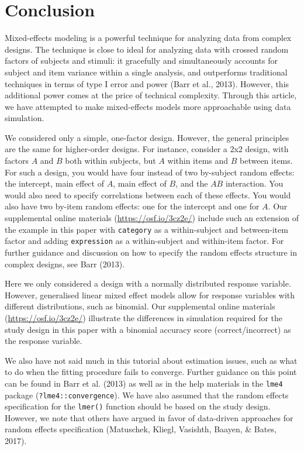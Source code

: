 \documentclass[
  english,
  doc,floatsintext]{apa6}
\begin{document}
\hypertarget{conclusion}{%
\section{Conclusion}\label{conclusion}}

Mixed-effects modeling is a powerful technique for analyzing data from complex designs. The technique is close to ideal for analyzing data with crossed random factors of subjects and stimuli: it gracefully and simultaneously accounts for subject and item variance within a single analysis, and outperforms traditional techniques in terms of type I error and power (Barr et al., 2013). However, this additional power comes at the price of technical complexity. Through this article, we have attempted to make mixed-effects models more approachable using data simulation.

We considered only a simple, one-factor design. However, the general principles are the same for higher-order designs. For instance, consider a 2x2 design, with factors \(A\) and \(B\) both within subjects, but \(A\) within items and \(B\) between items. For such a design, you would have four instead of two by-subject random effects: the intercept, main effect of \(A\), main effect of \(B\), and the \(AB\) interaction. You would also need to specify correlations between each of these effects. You would also have two by-item random effects: one for the intercept and one for \(A\). Our supplemental online materials (\url{https://osf.io/3cz2e/}) include such an extension of the example in this paper with \texttt{category} as a within-subject and between-item factor and adding \texttt{expression} as a within-subject and within-item factor. For further guidance and discussion on how to specify the random effects structure in complex designs, see Barr (2013).

Here we only considered a design with a normally distributed response variable. However, generalised linear mixed effect models allow for response variables with different distributions, such as binomial. Our supplemental online materials (\url{https://osf.io/3cz2e/}) illustrate the differences in simulation required for the study design in this paper with a binomial accuracy score (correct/incorrect) as the response variable.

We also have not said much in this tutorial about estimation issues, such as what to do when the fitting procedure fails to converge. Further guidance on this point can be found in Barr et al. (2013) as well as in the help materials in the \texttt{lme4} package (\texttt{?lme4::convergence}). We have also assumed that the random effects specification for the \texttt{lmer()} function should be based on the study design. However, we note that others have argued in favor of data-driven approaches for random effects specification (Matuschek, Kliegl, Vasishth, Baayen, \& Bates, 2017).
\end{document}
